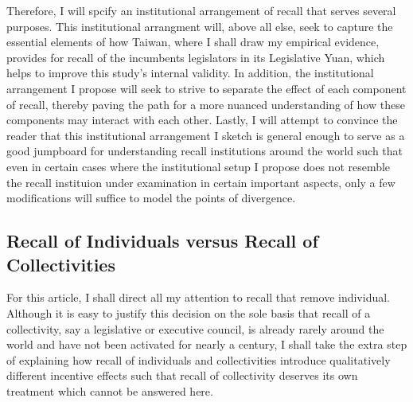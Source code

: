 \documentclass[hyphens, crop=false]{standalone}
\begin{document}
		Therefore, I will spcify an institutional arrangement of recall that serves several purposes.
		This institutional arrangment will,
		above all else,
		seek to capture the essential elements of
		how Taiwan, where I shall draw my empirical evidence,
		provides for recall of the incumbents legislators in its Legislative Yuan,
		which helps to improve this study's internal validity.
		In addition, the institutional arrangement I propose will seek to
		strive to separate the effect of each component of recall,
		thereby paving the path for a more nuanced understanding of how these components may interact with each other.
		Lastly,
		I will attempt to convince the reader that
		this institutional arrangement I sketch is general enough to
		serve as a good jumpboard for understanding recall institutions around the world such that
		even in certain cases where the institutional setup I propose does not resemble the recall instituion under examination in certain important aspects,
		only a few modifications will suffice to model the points of divergence.
		
		\subsection*{Recall of Individuals versus Recall of Collectivities}
		For this article, I shall direct all my attention to recall that remove individual.
		Although it is easy to justify this decision on the sole basis that
		recall of a collectivity,
		say a legislative or executive council,
		is already rarely around the world and have not been activated for nearly a century,
		I shall take the extra step of explaining
		how recall of individuals and collectivities
		introduce qualitatively different incentive effects
		such that recall of collectivity deserves its own treatment which cannot be answered here.
\end{document}
